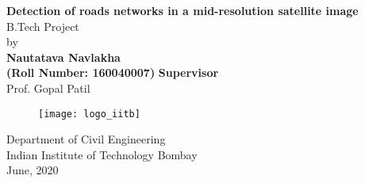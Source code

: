 \begin{titlepage}
  \vspace{3 cm}
  \begin{center}
  \large{\textbf{Detection of roads networks in a mid-resolution satellite image}}\bigskip \\
  
  \vspace{3mm}
  \vfill
  B.Tech Project \\
  by \bigskip \\
  \textbf{Nautatava Navlakha\\(Roll Number: 160040007)}
  \vfill
  \textbf{Supervisor}\\
  Prof. Gopal Patil\\
\vfill  \begin{figure}[h]
  \texttt{[image: logo\_iitb]}
  \centering
  \end{figure}
  \vfill
  \large
  
Department of Civil Engineering\\
Indian Institute of Technology Bombay\\
June, 2020
\end{center}
\vfill %
\end{titlepage}
